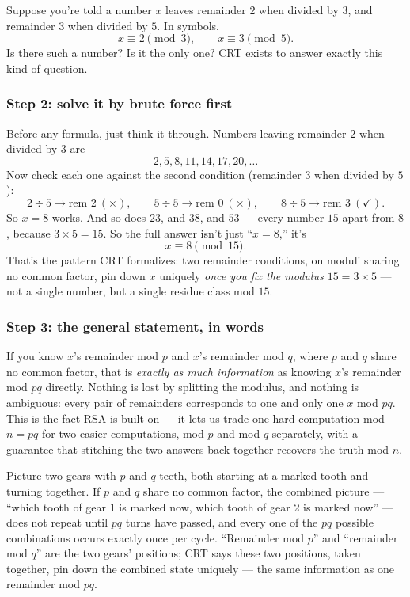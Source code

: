 Suppose you're told a number $x$ leaves remainder $2$ when divided by $3$, and remainder $3$ when divided by $5$. In symbols,
\[
x \equiv 2 \pmod 3, \qquad x \equiv 3 \pmod 5.
\]
Is there such a number? Is it the only one? CRT exists to answer exactly this kind of question.

\subsubsection*{Step 2: solve it by brute force first}

Before any formula, just think it through. Numbers leaving remainder $2$ when divided by $3$ are
\[
2, 5, 8, 11, 14, 17, 20, \ldots
\]
Now check each one against the second condition (remainder $3$ when divided by $5$):
\[
2\div5\to\text{rem }2\ (\times), \qquad 5\div5\to\text{rem }0\ (\times), \qquad 8\div5\to\text{rem }3\ (\checkmark).
\]
So $x=8$ works. And so does $23$, and $38$, and $53$ — every number $15$ apart from $8$, because $3\times5=15$. So the full answer isn't just ``$x=8$,'' it's
\[
x \equiv 8 \pmod{15}.
\]
That's the pattern CRT formalizes: two remainder conditions, on moduli sharing no common factor, pin down $x$ uniquely \emph{once you fix the modulus $15=3\times5$} — not a single number, but a single residue class mod $15$.

\subsubsection*{Step 3: the general statement, in words}

If you know $x$'s remainder mod $p$ and $x$'s remainder mod $q$, where $p$ and $q$ share no common factor, that is \emph{exactly as much information} as knowing $x$'s remainder mod $pq$ directly. Nothing is lost by splitting the modulus, and nothing is ambiguous: every pair of remainders corresponds to one and only one $x$ mod $pq$. This is the fact RSA is built on — it lets us trade one hard computation mod $n=pq$ for two easier computations, mod $p$ and mod $q$ separately, with a guarantee that stitching the two answers back together recovers the truth mod $n$.

\begin{remark}
Picture two gears with $p$ and $q$ teeth, both starting at a marked tooth and turning together. If $p$ and $q$ share no common factor, the combined picture — ``which tooth of gear 1 is marked now, which tooth of gear 2 is marked now'' — does not repeat until $pq$ turns have passed, and every one of the $pq$ possible combinations occurs exactly once per cycle. ``Remainder mod $p$'' and ``remainder mod $q$'' are the two gears' positions; CRT says these two positions, taken together, pin down the combined state uniquely — the same information as one remainder mod $pq$.
\end{remark}

